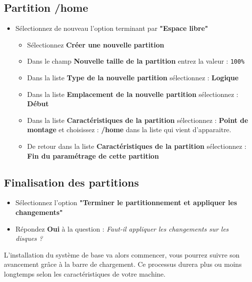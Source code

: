 \subsection{Partition /home}
\begin{itemize}
	\item Sélectionnez de nouveau l'option terminant par \textbf{"Espace libre"}
	\begin{itemize}
		\item Sélectionnez \textbf{Créer une nouvelle partition}
		\item Dans le champ \textbf{Nouvelle taille de la partition} entrez la valeur : \texttt{100\%}
		\item Dans la liste \textbf{Type de la nouvelle partition} sélectionnez : \textbf{Logique}
		\item Dans la liste \textbf{Emplacement de la nouvelle partition} sélectionnez : \textbf{Début}
		\item Dans la liste \textbf{Caractéristiques de la partition} sélectionnez : \textbf{Point de montage} et choisissez : \textbf{/home} dans la liste qui vient d'apparaitre.
		\item De retour dans la liste \textbf{Caractéristiques de la partition} sélectionnez : \textbf{Fin du paramétrage de cette partition}
	\end{itemize}	
\end{itemize}

\subsection{Finalisation des partitions}
\begin{itemize}
	\item Sélectionnez l'option \textbf{"Terminer le partitionnement et appliquer les changements"}
	\item Répondez \textbf{Oui} à la question : \textit{Faut-il appliquer les changements sur les disques ?}\\
\end{itemize}

L'installation du système de base va alors commencer, vous pourrez suivre son avancement grâce à la barre de chargement. Ce processus durera plus ou moins longtemps selon les caractéristiques de votre machine.

